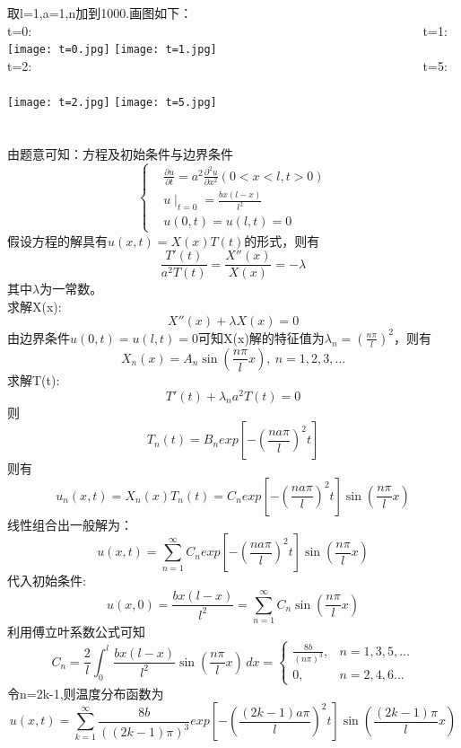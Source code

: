 \documentclass[10.5pt]{article}
\begin{document}
取l=1,a=1,n加到1000.画图如下：\\\indent
t=0: ~~~~~~~~~~~~~~~~~~~~~~~~~~~~~~~~~~~~~~~ ~~~~~~~~~~~~~~~~~~~~~~t=1:\\
\texttt{[image: t=0.jpg]}
\texttt{[image: t=1.jpg]}\\\indent
t=2: ~~~~~~~~~~~~~~~~~~~~~~~~~~~~~~~~~~~~~~~ ~~~~~~~~~~~~~~~~~~~~~~t=5:\\\\
\texttt{[image: t=2.jpg]}
\texttt{[image: t=5.jpg]}\\\indent

\section{}
由题意可知：方程及初始条件与边界条件$$\left\{\begin{aligned}
    &\frac{\partial u}{\partial t}=a^2\frac{\partial^2u}{\partial x^2}(0<x<l,t>0)\\
    &u\mid_{t=0}=\frac{bx(l-x)}{l^2}\\
    &u(0,t)=u(l,t)=0
\end{aligned}\right.$$\indent
假设方程的解具有$u(x,t)=X(x)T(t)$的形式，则有$$\frac{T'(t)}{a^2T(t)}=\frac{X''(x)}{X(x)}=-\lambda$$\indent
其中$\lambda$为一常数。\\\indent
求解X(x):$$X''(x)+\lambda X(x)=0$$\indent
由边界条件$u(0,t)=u(l,t)=0$可知X(x)解的特征值为$\lambda_n=\left(\frac{n\pi}{l}\right)^2$，则有$$X_n(x)=A_n\sin\left(\frac{n\pi}{l}x\right),~n=1,2,3,\dots$$\indent
求解T(t):$$T'(t)+\lambda_n a^2T(t)=0$$\indent
则$$T_n(t)=B_nexp\left[-\left(\frac{na\pi}{l}\right)^2t\right]$$\indent
则有$$u_n(x,t)=X_n(x)T_n(t)=C_nexp\left[-\left(\frac{na\pi}{l}\right)^2t\right]\sin\left(\frac{n\pi}{l}x\right)$$\indent
线性组合出一般解为：$$u(x,t)=\sum_{n=1}^{\infty}C_nexp\left[-\left(\frac{na\pi}{l}\right)^2t\right]\sin\left(\frac{n\pi}{l}x\right)$$\indent
代入初始条件:$$u(x,0)=\frac{bx(l-x)}{l^2}=\sum_{n=1}^{\infty}C_n\sin\left(\frac{n\pi}{l}x\right)$$\indent
利用傅立叶系数公式可知$$C_n=\frac{2}{l}\int_0^l\frac{bx(l-x)}{l^2}\sin\left(\frac{n\pi}{l}x\right)\,dx=\begin{cases}
    \frac{8b}{\left(n\pi\right)^3},&n=1,3,5,\dots\\
    0,&n=2,4,6\dots
\end{cases}$$\indent
令n=2k-1,则温度分布函数为$$u(x,t)=\sum_{k=1}^{\infty}\frac{8b}{\left((2k-1)\pi\right)^3}exp\left[-\left(\frac{(2k-1)a\pi}{l}\right)^2t\right]\sin\left(\frac{(2k-1)\pi}{l}x\right)$$
\end{document}

